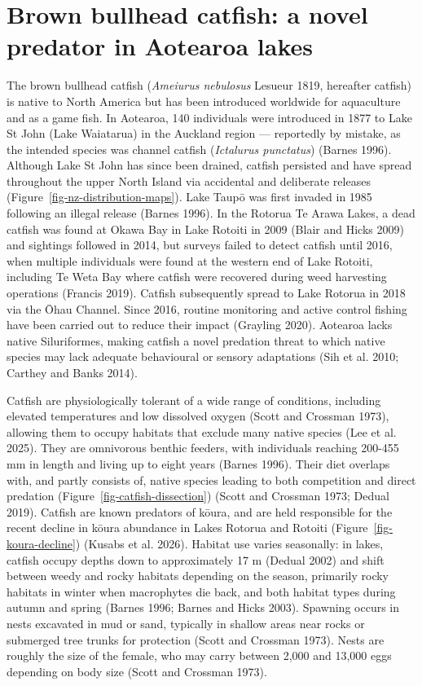 \documentclass[
  12pt,
  a4paper,
]{scrbook}
\begin{document}
\section{Brown bullhead catfish: a novel predator in Aotearoa
lakes}\label{brown-bullhead-catfish-a-novel-predator-in-aotearoa-lakes}

The brown bullhead catfish (\emph{Ameiurus nebulosus} Lesueur 1819,
hereafter catfish) is native to North America but has been introduced
worldwide for aquaculture and as a game fish. In Aotearoa, 140
individuals were introduced in 1877 to Lake St John (Lake Waiatarua) in
the Auckland region --- reportedly by mistake, as the intended species
was channel catfish (\emph{Ictalurus punctatus}) (Barnes 1996). Although
Lake St John has since been drained, catfish persisted and have spread
throughout the upper North Island via accidental and deliberate releases
(Figure~\ref{fig-nz-distribution-maps}). Lake Taupō was first invaded in
1985 following an illegal release (Barnes 1996). In the Rotorua Te Arawa
Lakes, a dead catfish was found at Okawa Bay in Lake Rotoiti in 2009
(Blair and Hicks 2009) and sightings followed in 2014, but surveys
failed to detect catfish until 2016, when multiple individuals were
found at the western end of Lake Rotoiti, including Te Weta Bay where
catfish were recovered during weed harvesting operations (Francis 2019).
Catfish subsequently spread to Lake Rotorua in 2018 via the Ōhau
Channel. Since 2016, routine monitoring and active control fishing have
been carried out to reduce their impact (Grayling 2020). Aotearoa lacks
native Siluriformes, making catfish a novel predation threat to which
native species may lack adequate behavioural or sensory adaptations (Sih
et al. 2010; Carthey and Banks 2014).

Catfish are physiologically tolerant of a wide range of conditions,
including elevated temperatures and low dissolved oxygen (Scott and
Crossman 1973), allowing them to occupy habitats that exclude many
native species (Lee et al. 2025). They are omnivorous benthic feeders,
with individuals reaching 200-455 mm in length and living up to eight
years (Barnes 1996). Their diet overlaps with, and partly consists of,
native species leading to both competition and direct predation
(Figure~\ref{fig-catfish-dissection}) (Scott and Crossman 1973; Dedual
2019). Catfish are known predators of kōura, and are held responsible
for the recent decline in kōura abundance in Lakes Rotorua and Rotoiti
(Figure~\ref{fig-koura-decline}) (Kusabs et al. 2026). Habitat use
varies seasonally: in lakes, catfish occupy depths down to approximately
17 m (Dedual 2002) and shift between weedy and rocky habitats depending
on the season, primarily rocky habitats in winter when macrophytes die
back, and both habitat types during autumn and spring (Barnes 1996;
Barnes and Hicks 2003). Spawning occurs in nests excavated in mud or
sand, typically in shallow areas near rocks or submerged tree trunks for
protection (Scott and Crossman 1973). Nests are roughly the size of the
female, who may carry between 2,000 and 13,000 eggs depending on body
size (Scott and Crossman 1973).
\end{document}
